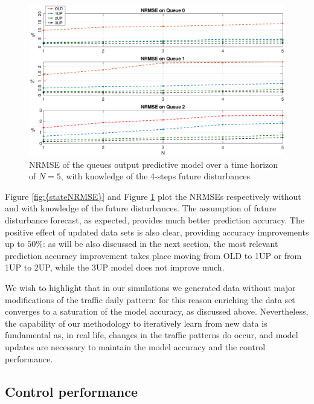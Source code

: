 \begin{figure}[th!]
	\centering
	\includegraphics[trim={120 0 120 0}, width=0.9\linewidth]{figure/Error_State_ddM4.eps}
	\caption{NRMSE of the queues output predictive model over a time horizon of $N=5$, with knowledge of the 4-steps future disturbances}
	\label{fig:{stateNRMSEddM4}}
\end{figure}

Figure \ref{fig:{stateNRMSE}} and Figure \ref{fig:{stateNRMSEddM4}} plot the NRMSEs respectively without and with knowledge of the future disturbances. The assumption of future disturbance forecast, as expected, provides much better prediction accuracy. The positive effect of updated data sets is also clear, providing accuracy improvements up to $50 \%$: as will be also discussed in the next section, the most relevant prediction accuracy improvement takes place moving from OLD to 1UP or from 1UP to 2UP, while the 3UP model does not improve much.

\begin{remark}
We wish to highlight that in our simulations we generated data without major modifications of the traffic daily pattern: for this reason enriching the data set converges to a saturation of the model accuracy, as discussed above. Nevertheless, the capability of our methodology to iteratively learn from new data is fundamental as, in real life, changes in the traffic patterns do occur, and model updates are necessary to maintain the model accuracy and the control performance. 
\end{remark}


\subsection{Control performance}\label{sec:control_performance}

